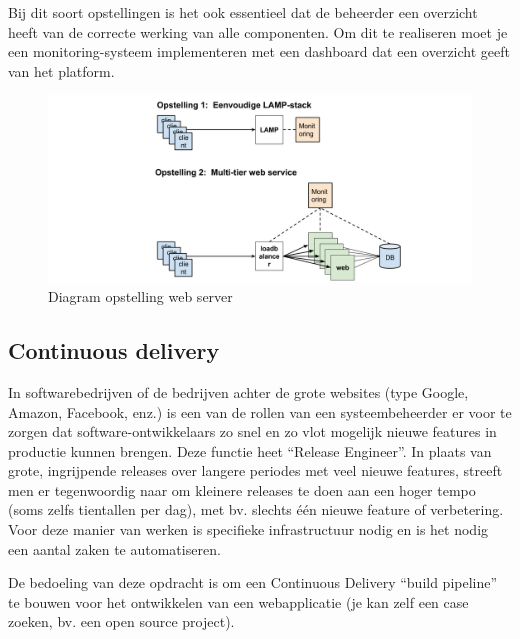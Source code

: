 Bij dit soort opstellingen is het ook essentieel dat de beheerder een overzicht heeft van de correcte werking van alle componenten. Om dit te realiseren moet je een monitoring-systeem implementeren met een dashboard dat een overzicht geeft van het platform.

\begin{figure}[htbp]
\centering
\includegraphics[width=\textwidth]{img/assignment-ha.png}
\caption{Diagram opstelling web server}
\end{figure}

\subsection{Continuous delivery}
\label{subs:continuous-delivery}

In softwarebedrijven of de bedrijven achter de grote websites (type Google, Amazon, Facebook, enz.) is een van de rollen van een systeembeheerder er voor te zorgen dat software-ontwikkelaars zo snel en zo vlot mogelijk nieuwe features in productie kunnen brengen. Deze functie heet ``Release Engineer''. In plaats van grote, ingrijpende releases over langere periodes met veel nieuwe features, streeft men er tegenwoordig naar om kleinere releases te doen aan een hoger tempo (soms zelfs tientallen per dag), met bv. slechts één nieuwe feature of verbetering. Voor deze manier van werken is specifieke infrastructuur nodig en is het nodig een aantal zaken te automatiseren.

De bedoeling van deze opdracht is om een Continuous Delivery ``build pipeline'' te bouwen voor het ontwikkelen van een webapplicatie (je kan zelf een case zoeken, bv. een open source project).

